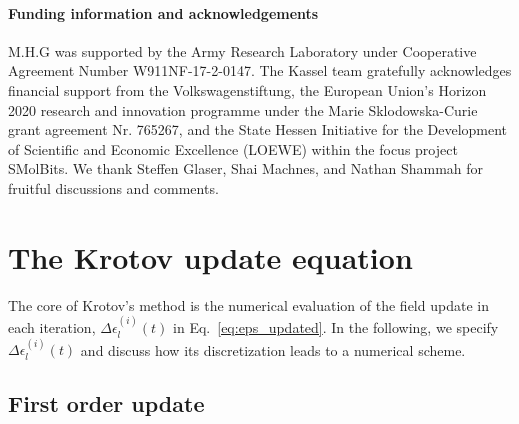 \documentclass[submission, Phys]{SciPost}
\begin{document}
\paragraph{Funding information and acknowledgements}

M.H.G was supported by the Army Research Laboratory under Cooperative Agreement
Number W911NF-17-2-0147.
The Kassel team gratefully acknowledges financial support from the
Volkswagenstiftung, the European Union's Horizon 2020 research and innovation
programme under the Marie Sklodowska-Curie grant agreement Nr.
765267, and the State Hessen Initiative for the Development of Scientific and
Economic Excellence (LOEWE) within the focus project SMolBits.
We thank Steffen Glaser, Shai Machnes, and Nathan Shammah for fruitful
discussions and comments.



\appendix

\section{The Krotov update equation}%
\label{apx:krotov_update}

The core of Krotov's method is the numerical evaluation of the field update in
each iteration, $\Delta \epsilon^{(i)}_l(t)$ in Eq.~\eqref{eq:eps_updated}.
In the following, we specify $\Delta \epsilon^{(i)}_l(t)$ and discuss how its
discretization leads to a numerical scheme.

\subsection{First order update}%
\label{apx:krotov_update_first_order}
\end{document}
